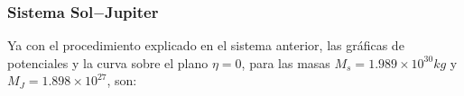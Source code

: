 \subsubsection{Sistema Sol$-$Jupiter}
Ya con el procedimiento explicado en el sistema anterior, las gráficas de potenciales y la curva sobre el plano $\eta = 0$, para las masas $M_s = 1.989\times 10 ^{30} kg$ y $M_J = 1.898\times 10 ^{27}$, son: 

\begin{figure}[H]
\centering
{}

\end{figure}
